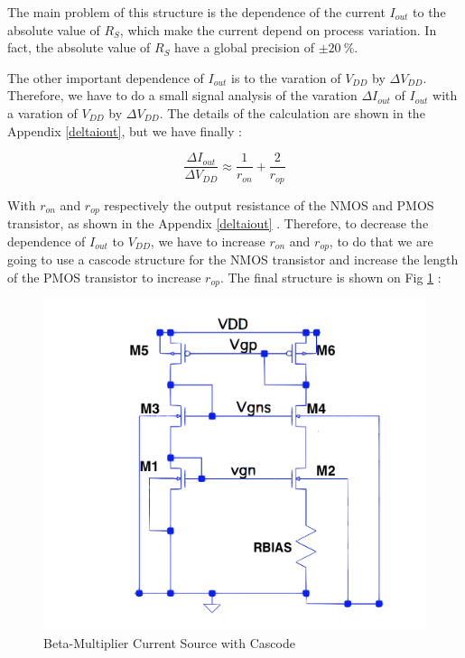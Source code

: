 \documentclass[11pt,a4paper]{report}
\begin{document}
The main problem of this structure is the dependence of the current $I_{out}$ to the absolute value of $R_S$, which make the current depend on process variation. In fact, the absolute value of $R_S$ have a global precision of $\pm 20~\%$.

The other important dependence of $I_{out}$ is to the varation of $V_{DD}$ by $\Delta V_{DD}$. Therefore, we have to do a small signal analysis of the varation $\Delta I_{out}$ of $I_{out}$ with a varation of $V_{DD}$ by $\Delta V_{DD}$. The details of the calculation are shown in the Appendix \ref{deltaiout}, but we have finally :

\begin{equation}
  \frac{\Delta I_{out}}{\Delta V_{DD}} \approx \frac{1}{r_{on}} + \frac{2}{r_{op}}
\end{equation} 

With $r_{on}$ and $r_{op}$ respectively the output resistance of the NMOS and PMOS transistor, as shown in the Appendix \ref{deltaiout} . Therefore, to decrease the dependence of $I_{out}$ to $V_{DD}$, we have to increase $r_{on}$ and $r_{op}$, to do that we are going to use a cascode structure for the NMOS transistor and increase the length of the PMOS transistor to increase $r_{op}$. The final structure is shown on Fig \ref{beta_m_C} :

\begin{figure}[h]
  \begin{center}
    \includegraphics[scale=0.35]{photo/beta_multiplier_c}
  \end{center}
  \caption{Beta-Multiplier Current Source with Cascode}
  \label{beta_m_C}
\end{figure}
\end{document}
